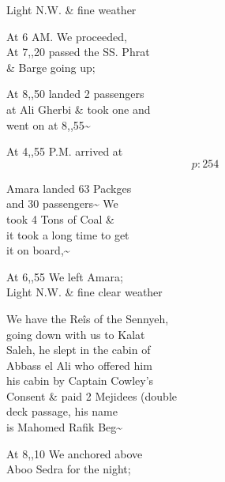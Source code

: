 \documentclass{report}
\begin{document}
	\par{
 	Light N.W. \& fine weather\ \\
	}

	\par{
 	At 6 AM. We proceeded,\ \\At 7,,20 passed the SS. Phrat\ \\\& Barge going up;\ \\
	}

	\par{
 	At 8,,50 landed 2 passengers\ \\at Ali Gherbi \& took one and\ \\went on at 8,,55\~{}\ \\
	}

	\par{
 	At 4,,55 P.M. arrived at\ \\
  \[p: 254 \]

	}


	\par{
 	Amara landed 63 Packges\ \\and 30 passengers\~{} We\ \\took 4 Tons of Coal \&\ \\it took a long time to get\ \\it on board,\~{}\ \\
	}

	\par{
 	At 6,,55 We left Amara;\ \\Light N.W. \& fine clear weather\ \\
	}

	\par{
 	We have the Reîs of the Sennyeh,\ \\going down with us to Kalat\ \\Saleh, he slept in the cabin of\ \\Abbass el Ali who offered him\ \\his cabin by Captain Cowley’s\ \\Consent \& paid 2 Mejidees (double\ \\deck passage, his name\ \\is Mahomed Rafik Beg\~{}\ \\
	}

	\par{
 	At 8,,10 We anchored above\ \\Aboo Sedra for the night;\ \\
	}
\end{document}
